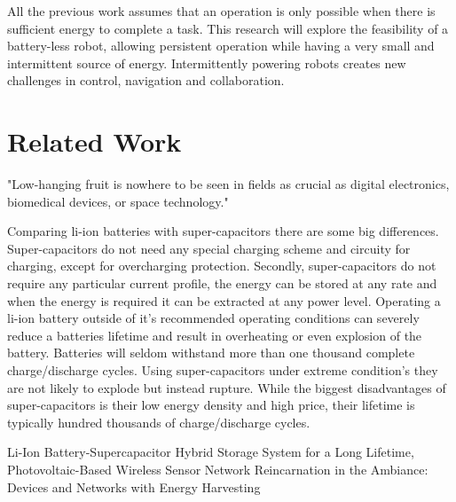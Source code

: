 \documentclass[letterpaper, 10 pt, conference]{ieeeconf}  %
\begin{document}
% 

All the previous work assumes that an operation is only possible when there is sufficient energy to complete a task. 
This research will explore the feasibility of a battery-less robot, allowing persistent operation while having a very small and intermittent source of energy.
Intermittently powering robots creates new challenges in control, navigation and collaboration.

\section{Related Work}

"Low-hanging fruit is nowhere to be seen in fields as crucial as digital electronics, biomedical devices, or space technology."
\cite{zachary_spec_2016}


Comparing li-ion batteries with super-capacitors there are some big differences.
Super-capacitors do not need any special charging scheme and circuity for charging, except for overcharging protection.
Secondly, super-capacitors do not require any particular current profile, the energy can be stored at any rate and when the energy is required it can be extracted at any power level.
Operating a li-ion battery outside of it's recommended operating conditions can severely reduce a batteries lifetime and result in overheating or even explosion of the battery.
Batteries will seldom withstand more than one thousand complete charge/discharge cycles.
Using super-capacitors under extreme condition's they are not likely to explode but instead rupture.
While the biggest disadvantages of super-capacitors is their low energy density and high price, their lifetime is typically hundred thousands of charge/discharge cycles.

Li-Ion Battery-Supercapacitor Hybrid Storage System for a Long Lifetime, Photovoltaic-Based Wireless Sensor Network	\cite{ongaro_pwre_2012}
Reincarnation in the Ambiance: Devices and Networks with Energy Harvesting \cite{prasad_comst_2014}




\end{document}
